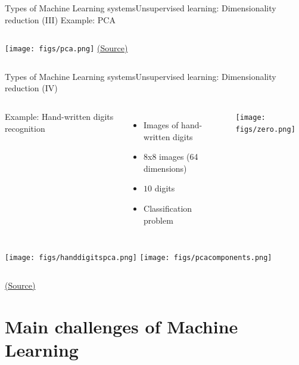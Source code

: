 \documentclass[10pt,compress]{beamer} %
\begin{document}
\begin{frame}[fragile]{Types of Machine Learning systems}{Unsupervised learning: Dimensionality reduction (III)}
	Example: PCA

    \begin{columns}
			\texttt{[image: figs/pca.png]}
    		\centering \tiny{\href{https://github.com/amueller/introduction_to_ml_with_python/blob/master/03-unsupervised-learning.ipynb}{(Source)}}
    \end{columns}
\end{frame}

\begin{frame}[fragile]{Types of Machine Learning systems}{Unsupervised learning: Dimensionality reduction (IV)}
	\vspace{-0.5cm}
    \begin{columns}
		Example: Hand-written digits recognition
		\begin{itemize}
			\item Images of hand-written digits
			\item 8x8 images (64 dimensions)
			\item $10$ digits
			\item Classification problem
		\end{itemize}
			\texttt{[image: figs/zero.png]}
    \end{columns}

    \begin{columns}
			\texttt{[image: figs/handdigitspca.png]}
			\texttt{[image: figs/pcacomponents.png]}
    \end{columns}

   	\centering \tiny{\href{https://github.com/amueller/introduction_to_ml_with_python/blob/master/03-unsupervised-learning.ipynb}{(Source)}}
\end{frame}

\section{Main challenges of Machine Learning}
\end{document}
